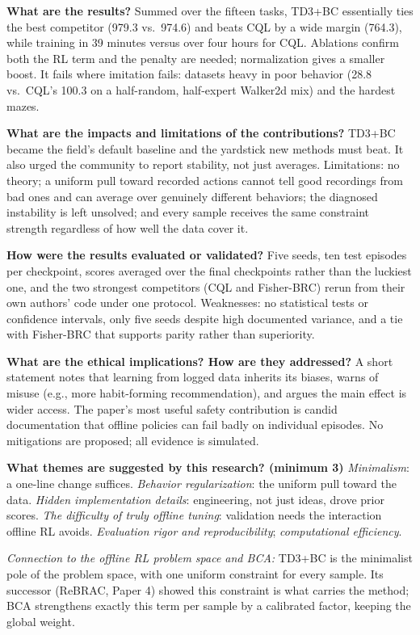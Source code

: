 \documentclass[11pt]{article}
\newcommand{\q}[2]{\item \textbf{#1} #2}
\newcommand{\tiein}[1]{\par\smallskip\noindent\emph{Connection to the offline RL problem space and BCA:} #1\par\medskip}
\begin{document}
\begin{qna}
\q{What are the results?}
Summed over the fifteen tasks, TD3+BC essentially ties the best competitor (979.3 vs.\ 974.6) and beats CQL by a wide margin (764.3), while training in 39 minutes versus over four hours for CQL. Ablations confirm both the RL term and the penalty are needed; normalization gives a smaller boost. It fails where imitation fails: datasets heavy in poor behavior (28.8 vs.\ CQL's 100.3 on a half-random, half-expert Walker2d mix) and the hardest mazes.

\q{What are the impacts and limitations of the contributions?}
TD3+BC became the field's default baseline and the yardstick new methods must beat. It also urged the community to report stability, not just averages. Limitations: no theory; a uniform pull toward recorded actions cannot tell good recordings from bad ones and can average over genuinely different behaviors; the diagnosed instability is left unsolved; and every sample receives the same constraint strength regardless of how well the data cover it.

\q{How were the results evaluated or validated?}
Five seeds, ten test episodes per checkpoint, scores averaged over the final checkpoints rather than the luckiest one, and the two strongest competitors (CQL and Fisher-BRC) rerun from their own authors' code under one protocol. Weaknesses: no statistical tests or confidence intervals, only five seeds despite high documented variance, and a tie with Fisher-BRC that supports parity rather than superiority.

\q{What are the ethical implications? How are they addressed?}
A short statement notes that learning from logged data inherits its biases, warns of misuse (e.g., more habit-forming recommendation), and argues the main effect is wider access. The paper's most useful safety contribution is candid documentation that offline policies can fail badly on individual episodes. No mitigations are proposed; all evidence is simulated.

\q{What themes are suggested by this research? (minimum 3)}
\emph{Minimalism}: a one-line change suffices. \emph{Behavior regularization}: the uniform pull toward the data. \emph{Hidden implementation details}: engineering, not just ideas, drove prior scores. \emph{The difficulty of truly offline tuning}: validation needs the interaction offline RL avoids. \emph{Evaluation rigor and reproducibility}; \emph{computational efficiency}.

\end{qna}
\tiein{TD3+BC is the minimalist pole of the problem space, with one uniform constraint for every sample. Its successor (ReBRAC, Paper 4) showed this constraint is what carries the method; BCA strengthens exactly this term per sample by a calibrated factor, keeping the global weight.}
\end{document}
